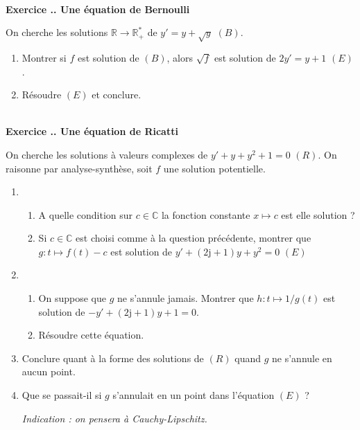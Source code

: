 \documentclass{article}
\newcommand{\mb}[1]{\mathbb{#1}}
\newcounter{exo}
\newcommand{\exercice}[1][\null]{\textbf{\\ Exercice \thesection.\theexo. #1} \addtocounter{exo}{1}}
\begin{document}
\exercice[Une équation de Bernoulli]

On cherche les solutions $\mb{R} \rightarrow \mb{R}_+^*$ de $y' = y +  \sqrt{y}$ $(B)$.

\begin{enumerate}

\item Montrer si $f$ est solution de $(B)$, alors $\sqrt{f}$ est solution de $2y' =  y + 1$ $(E)$.

\item Résoudre $(E)$ et conclure.

\end{enumerate}


\exercice[Une équation de Ricatti]

On cherche les solutions à valeurs complexes de $y' + y + y^2 + 1 = 0$ $(R)$. On raisonne par analyse-synthèse, soit $f$ une solution potentielle.

\begin{enumerate}

\item  \begin{enumerate}

\item A quelle condition sur $c \in \mb{C}$ la fonction constante $x \mapsto c$ est elle solution ?

\item Si $c \in \mb{C}$ est choisi comme à la question précédente, montrer que $g : t \mapsto f(t) -c$ est solution de $y' + (2\text{j} +1) y + y^2 = 0$ $(E)$

\end{enumerate}
 
\item \begin{enumerate}
\item On suppose que $g$ ne s'annule jamais. Montrer que $h : t \mapsto 1/g(t)$ est solution de $-y' + (2 \text{j}+1)y +1 = 0$.

\item Résoudre cette équation.

\end{enumerate}


\item Conclure quant à la forme des solutions de $(R)$ quand $g$ ne s'annule en aucun point.

\item Que se passait-il si $g$ s'annulait en un point dans l'équation $(E)$ ?

\emph{Indication : on pensera à Cauchy-Lipschitz.}
\end{enumerate}
\end{document}

